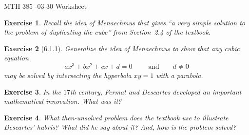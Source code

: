 \documentclass[12pt]{article}
\theoremstyle{plain}
\newtheorem{ex}{Exercise}
\begin{document}
MTH 385 -03-30 Worksheet

\begin{ex}
  Recall the idea of Menaechmus that gives ``a very simple solution to the problem of duplicating the cube'' from Section~2.4 of the textbook.
\end{ex}

\begin{ex} [6.1.1]
  Generalize the idea of Menaechmus to show that any cubic equation
  \[
    ax^3+bx^2+cx+d=0\qquad\text{ and}\qquad d\neq0
  \]
  may be solved by intersecting the hyperbola $xy=1$ with a parabola.
\end{ex}

\begin{ex}
  In the $17$th century, Fermat and Descartes developed an important mathematical innovation. What was it?
\end{ex}

\begin{ex}
  What then-unsolved problem does the textbook use to illustrate Descartes' hubris? What did he say about it? And, how is the problem solved?
\end{ex}
\end{document}
